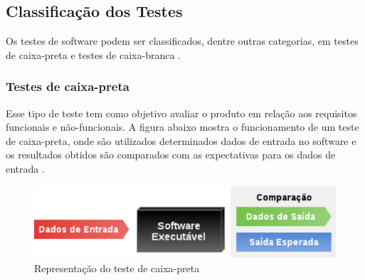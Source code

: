 \subsection{Classificação dos Testes}
Os testes de software podem ser classificados, dentre outras categorias, em testes de caixa-preta e testes de caixa-branca \cite{barbosa2009}.

\subsubsection{Testes de caixa-preta}
Esse tipo de teste tem como objetivo avaliar o produto em relação aos requisitos funcionais e não-funcionais. A figura abaixo mostra o funcionamento de um teste de caixa-preta, onde são utilizados determinados dados de entrada no software e os resultados obtidos são comparados com as expectativas para os dados de entrada \cite{barbosa2009}.

\begin{figure}[h]
  \centering
  \includegraphics[scale=0.7]{figuras/caixa-preta.eps}
  \caption{Representação do teste de caixa-preta}
\end{figure}